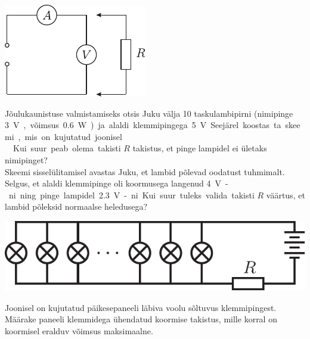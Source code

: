 \documentclass[10pt]{article}
\begin{document}
{\begin{center}
	\includegraphics[width=0.5\linewidth]{2006-v3g-01-yl}
\end{center}
\probend
\bigskip


Jõulukaunistuse valmistamiseks otsis Juku välja 10
taskulambipirni (nimipinge \SI{3}V, võimsus \SI{0.6}W) ja alaldi klemmipingega \SI{5}V.
Seejärel koostas ta skeemi, mis on kujutatud joonisel.\\
\osa Kui suur peab olema
takisti $R$ takistus, et pinge lampidel ei ületaks nimipinget?\\
\osa Skeemi sisselülitamisel avastas Juku, et lambid põlevad oodatust tuhmimalt. Selgus, et alaldi
klemmipinge oli koormusega langenud \SI{4}V-ni ning pinge lampidel \SI{2,3}V-ni. Kui suur
tuleks valida takisti $R$ väärtus, et lambid põleksid normaalse heledusega?

\begin{center}
	\includegraphics[width=0.8\linewidth]{2009-v2g-04-yl}
\end{center}
\probend
\bigskip


Joonisel on kujutatud päikesepaneeli läbiva voolu sõltuvus klemmipingest.
Määrake paneeli klemmidega ühendatud koormise takistus, mille korral on koormisel eralduv
võimsus maksimaalne.

}
\end{document}
